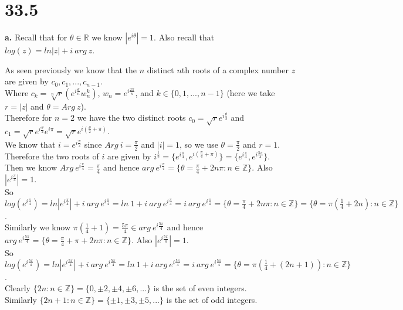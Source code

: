 \documentclass{article}
\begin{document}
\newpage
\section*{33.5}

{\Large\textbf{a.}} Recall that for $\theta\in\mathbb{R}$ we know $|e^{i\theta}| = 1$. Also recall that $log(z) = ln|z| + i\:arg\:z$.
\begin{center}
    \doublespacing
    As seen previously we know that the $n$ distinct $n$th roots of a complex number $z$ are given by $c_0, c_1, ..., c_{n-1}$.
    \\Where $c_k =\sqrt[n]{r} (e^{i\frac{\theta}{n}} w_n^k)$, $w_n = e^{i\frac{2\pi}{n}}$, and $k\in\{0, 1, ..., n-1\}$ (here we take $r = |z|$ and $\theta = Arg\:z$).
    \\Therefore for $n = 2$ we have the two distinct roots $c_0 =\sqrt{r} e^{i\frac{\theta}{2}}$ and $c_1 =\sqrt{r} e^{i\frac{\theta}{2}} e^{i\pi} =\sqrt{r} e^{i(\frac{\theta}{2} +\pi)}$.
    \\We know that $i = e^{i\frac{\pi}{2}}$ since $Arg\:i =\frac{\pi}{2}$ and $|i| = 1$, so we use $\theta =\frac{\pi}{2}$ and $r = 1$.
    \\Therefore the two roots of $i$ are given by $i^{\frac{1}{2}} =\{e^{i\frac{\pi}{4}}, e^{i(\frac{\pi}{4} +\pi)}\} =\{e^{i\frac{\pi}{4}}, e^{i\frac{5\pi}{4}}\}$.
    \break
    \\Then we know $Arg\:e^{i\frac{\pi}{4}} =\frac{\pi}{4}$ and hence $arg\:e^{i\frac{\pi}{4}} =\{\theta =\frac{\pi}{4} + 2n\pi:n\in\mathbb{Z}\}$. Also $|e^{i\frac{\pi}{4}}| = 1$.
    \\So $log(e^{i\frac{\pi}{4}}) = ln|e^{i\frac{\pi}{4}}| + i\:arg\:e^{i\frac{\pi}{4}} = ln\:1 + i\:arg\:e^{i\frac{\pi}{4}} = i\:arg\:e^{i\frac{\pi}{4}} =\{\theta =\frac{\pi}{4} + 2n\pi:n\in\mathbb{Z}\} =\{\theta =\pi(\frac{1}{4} + 2n):n\in\mathbb{Z}\}$.
    \break
    \\Similarly we know $\pi (\frac{1}{4} + 1) =\frac{5\pi}{4}\in arg\:e^{i\frac{5\pi}{4}}$ and hence $arg\:e^{i\frac{5\pi}{4}} =\{\theta =\frac{\pi}{4} +\pi + 2n\pi:n\in\mathbb{Z}\}$. Also $|e^{i\frac{5\pi}{4}}| = 1$.
    \\So $log(e^{i\frac{5\pi}{4}}) = ln|e^{i\frac{5\pi}{4}}| + i\:arg\:e^{i\frac{5\pi}{4}} = ln\:1 + i\:arg\:e^{i\frac{5\pi}{4}} = i\:arg\:e^{i\frac{5\pi}{4}} =\{\theta =\pi (\frac{1}{4} + (2n + 1)):n\in\mathbb{Z}\}$.
    \break
    \\Clearly $\{2n:n\in\mathbb{Z}\} =\{0,\pm 2,\pm 4,\pm 6, ...\}$ is the set of even integers.
    \\Similarly $\{2n+1:n\in\mathbb{Z}\} =\{\pm 1,\pm 3,\pm 5, ...\}$ is the set of odd integers.

\end{center}
\end{document}
